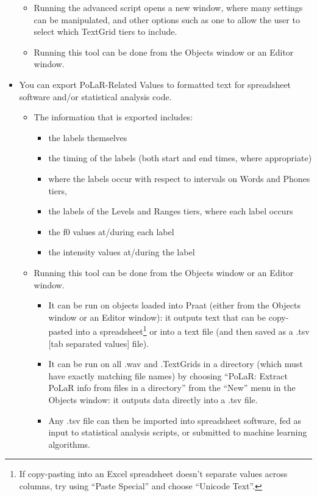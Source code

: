 \documentclass[11pt, twoside]{memoir}
\begin{document}
\begin{itemize}
\begin{itemize}
		\item Running the advanced script opens a new window, where many settings can be manipulated, and other options such as one to allow the user to select which TextGrid tiers to include.
		\item Running this tool can be done from the Objects window or an Editor window.
	\end{itemize}
	\item You can export PoLaR-Related Values to formatted text for spreadsheet software and/or statistical analysis code.
	\begin{itemize}
		\item The information that is exported includes:
			\begin{itemize}
			\item the labels themselves
			\item the timing of the labels (both start and end times, where appropriate)
			\item where the labels occur with respect to intervals on Words and Phones tiers, 
			\item the labels of the Levels and Ranges tiers, where each label occurs
			\item the f0 values at\slash during each label
			\item the intensity values at\slash during the label
			\end{itemize}
		\item Running this tool can be done from the Objects window or an Editor window.
		\begin{itemize}
			\item It can be run on objects loaded into Praat (either from the Objects window or an Editor window): it outputs text that can be copy-pasted into a spreadsheet\footnote{If copy-pasting into an Excel spreadsheet doesn’t separate values across columns, try using “Paste Special” and choose “Unicode Text”.} or into a text file (and then saved as a .tsv [tab separated values] file).
			\item It can be run on all .wav and .TextGrids in a directory (which must have exactly matching file names) by choosing “PoLaR: Extract PoLaR info from files in a directory” from the “New” menu in the Objects window: it outputs data directly into a .tsv file.
			\item Any .tsv file can then be imported into spreadsheet software, fed as input to statistical analysis scripts, or submitted to machine learning algorithms.
		\end{itemize}

\end{itemize}
\end{itemize}
\end{document}

